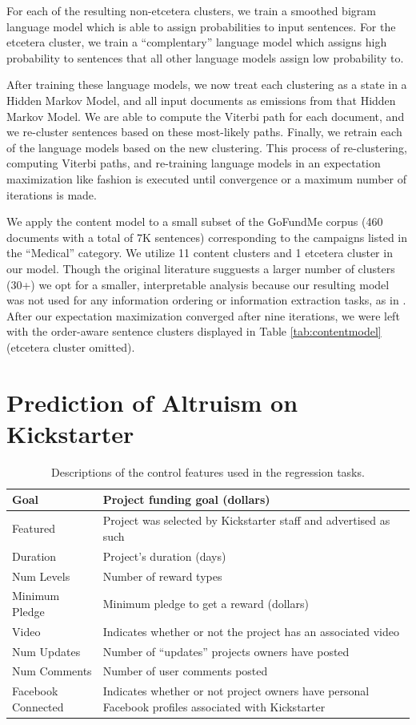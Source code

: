 \documentclass[letterpaper]{article}
\begin{document}
For each of the resulting non-etcetera clusters, we train a smoothed bigram language model which is able to assign probabilities to input sentences. For the etcetera cluster, we train a ``complentary'' language model which assigns high probability to sentences that all other language models assign low probability to.

After training these language models, we now treat each clustering as a state in a Hidden Markov Model, and all input documents as emissions from that Hidden Markov Model. We are able to compute the Viterbi path for each document, and we re-cluster sentences based on these most-likely paths. Finally, we retrain each of the language models based on the new clustering. This process of re-clustering, computing Viterbi paths, and re-training language models in an expectation maximization like fashion is executed until convergence or a maximum number of iterations is made. 

We apply the content model to a small subset of the GoFundMe corpus (460 documents with a total of 7K sentences) corresponding to the campaigns listed in the ``Medical'' category. We utilize 11 content clusters and 1 etcetera cluster in our model. Though the original literature sugguests a larger number of clusters (30+) we opt for a smaller, interpretable analysis because our resulting model was not used for any information ordering or information extraction tasks, as in \cite{barzilay2004catching}. After our expectation maximization converged after nine iterations, we were left with the order-aware sentence clusters displayed in Table \ref{tab:contentmodel} (etcetera cluster omitted).

\section{Prediction of Altruism on Kickstarter}
\begin{table}
\centering
\begin{tabular}{|l|L{5cm}|}
\hline
Goal & Project funding goal (dollars) \\\hline
Featured & Project was selected by Kickstarter staff and advertised as such\\\hline
Duration & Project's duration (days) \\\hline
Num Levels & Number of reward types \\\hline
Minimum Pledge & Minimum pledge to get a reward (dollars)\\\hline
Video & Indicates whether or not the project has an associated video \\\hline
Num Updates & Number of ``updates'' projects owners have posted \\\hline
Num Comments & Number of user comments posted \\\hline
Facebook Connected & Indicates whether or not project owners have personal Facebook profiles associated with Kickstarter\\
\hline
\end{tabular}
\caption{Descriptions of the control features used in the regression tasks.}
\label{tab:controls}
\end{table}
\end{document}
